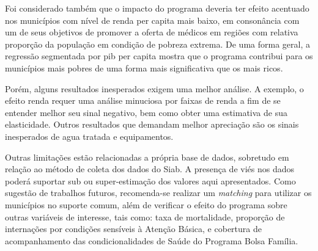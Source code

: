\documentclass[twoside,onecolumn,12pt]{article}
\numberwithin{outputctr}{section}
\begin{document}
%

Foi considerado também que o impacto do programa deveria ter efeito acentuado nos municípios com nível de renda per capita mais baixo, em consonância com um de seus objetivos de promover a oferta de médicos em regiões com relativa proporção da população em condição de pobreza extrema. De uma forma geral, a regress\~{a}o segmentada por pib per capita mostra que o programa contribui para os munic\'{i}pios mais pobres de uma forma mais significativa que os mais ricos.

Porém, alguns resultados inesperados exigem uma melhor análise. A exemplo, o efeito renda requer uma análise minuciosa por faixas de renda a fim de se entender melhor seu sinal negativo, bem como obter uma estimativa de sua elasticidade. Outros resultados que demandam melhor apreciação são os sinais inesperados de agua tratada e equipamentos.

Outras limitações estão relacionadas a própria base de dados, sobretudo em relação ao método de coleta dos dados do Siab. A presença de viés nos dados poderá suportar sub ou super-estimação dos valores aqui apresentados. Como sugest\~{a}o de trabalhos futuros, recomenda-se realizar um \textit{matching}
para utilizar os munic\'{i}pios no suporte comum, além de verificar o efeito do programa sobre outras vari\'{a}veis de interesse, tais como:
taxa de mortalidade, propor\c{c}\~{a}o de interna\c{c}\~{o}es por condi\c{c}\~{o}es sens\'{i}veis \`{a} Aten\c{c}\~{a}o B\'{a}sica,
e cobertura de acompanhamento das condicionalidades de Sa\'{u}de do Programa Bolsa Fam\'{i}lia.
\end{document}
